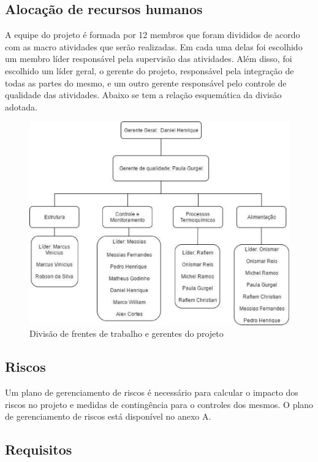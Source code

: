 \subsection{Alocação de recursos humanos}

A equipe do projeto é formada por 12 membros que foram divididos de acordo com as macro atividades que serão realizadas. Em cada uma delas foi escolhido um membro líder responsável pela supervisão das atividades. Além disso, foi escolhido um líder geral, o gerente do projeto, responsável pela integração de todas as partes do mesmo, e um outro gerente responsável pelo controle de qualidade das atividades. Abaixo se tem a relação esquemática da divisão adotada.

\begin{figure}[h]
	\centering
	\includegraphics[keepaspectratio=true,scale=0.5]{figuras/divisao.eps}
	\caption{Divisão de frentes de trabalho e gerentes do projeto}
	\label{divisao}
\end{figure}

\subsection{Riscos}

Um plano de gerenciamento de riscos é necessário para calcular o impacto dos riscos no projeto e medidas de contingência para o controles dos mesmos. O plano de gerenciamento de riscos está disponível no anexo A.

\subsection{Requisitos}

